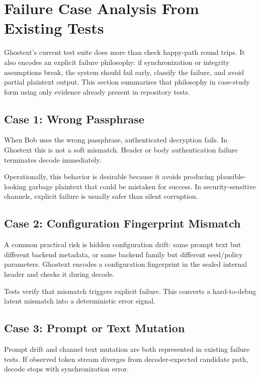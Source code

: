 \section{Failure Case Analysis From Existing Tests}

Ghostext's current test suite does more than check happy-path round trips. It also encodes an explicit failure philosophy: if synchronization or integrity assumptions break, the system should fail early, classify the failure, and avoid partial plaintext output. This section summarizes that philosophy in case-study form using only evidence already present in repository tests.

\subsection{Case 1: Wrong Passphrase}

When Bob uses the wrong passphrase, authenticated decryption fails. In Ghostext this is not a soft mismatch. Header or body authentication failure terminates decode immediately.

Operationally, this behavior is desirable because it avoids producing plausible-looking garbage plaintext that could be mistaken for success. In security-sensitive channels, explicit failure is usually safer than silent corruption.

\subsection{Case 2: Configuration Fingerprint Mismatch}

A common practical risk is hidden configuration drift: same prompt text but different backend metadata, or same backend family but different seed/policy parameters. Ghostext encodes a configuration fingerprint in the sealed internal header and checks it during decode.

Tests verify that mismatch triggers explicit failure. This converts a hard-to-debug latent mismatch into a deterministic error signal.

\subsection{Case 3: Prompt or Text Mutation}

Prompt drift and channel text mutation are both represented in existing failure tests. If observed token stream diverges from decoder-expected candidate path, decode stops with synchronization error.

